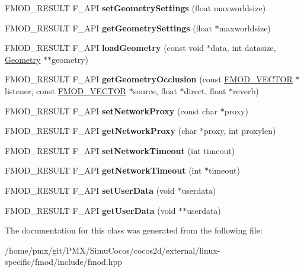 \begin{DoxyCompactItemize}
\item 
\mbox{\label{classFMOD_1_1System_a421603edcdc170de9d72d8ab95ee0fbd}} 
F\+M\+O\+D\+\_\+\+R\+E\+S\+U\+LT F\+\_\+\+A\+PI {\bfseries set\+Geometry\+Settings} (float maxworldsize)
\item 
\mbox{\label{classFMOD_1_1System_a4466ede69006041d702b6ac5be162c57}} 
F\+M\+O\+D\+\_\+\+R\+E\+S\+U\+LT F\+\_\+\+A\+PI {\bfseries get\+Geometry\+Settings} (float $\ast$maxworldsize)
\item 
\mbox{\label{classFMOD_1_1System_af9aa1402e3132a854037625ea6fabd4e}} 
F\+M\+O\+D\+\_\+\+R\+E\+S\+U\+LT F\+\_\+\+A\+PI {\bfseries load\+Geometry} (const void $\ast$data, int datasize, \hyperlink{classFMOD_1_1Geometry}{Geometry} $\ast$$\ast$geometry)
\item 
\mbox{\label{classFMOD_1_1System_ac1c462ead8eef9cbb955a898cd1c64a9}} 
F\+M\+O\+D\+\_\+\+R\+E\+S\+U\+LT F\+\_\+\+A\+PI {\bfseries get\+Geometry\+Occlusion} (const \hyperlink{structFMOD__VECTOR}{F\+M\+O\+D\+\_\+\+V\+E\+C\+T\+OR} $\ast$listener, const \hyperlink{structFMOD__VECTOR}{F\+M\+O\+D\+\_\+\+V\+E\+C\+T\+OR} $\ast$source, float $\ast$direct, float $\ast$reverb)
\item 
\mbox{\label{classFMOD_1_1System_ab1368bd2bd2bcba58d4c70c385277bd1}} 
F\+M\+O\+D\+\_\+\+R\+E\+S\+U\+LT F\+\_\+\+A\+PI {\bfseries set\+Network\+Proxy} (const char $\ast$proxy)
\item 
\mbox{\label{classFMOD_1_1System_a6346a910caaff928a7498f2bfeaf8a69}} 
F\+M\+O\+D\+\_\+\+R\+E\+S\+U\+LT F\+\_\+\+A\+PI {\bfseries get\+Network\+Proxy} (char $\ast$proxy, int proxylen)
\item 
\mbox{\label{classFMOD_1_1System_aad7cb557e4992666cfc304dfbac6d04e}} 
F\+M\+O\+D\+\_\+\+R\+E\+S\+U\+LT F\+\_\+\+A\+PI {\bfseries set\+Network\+Timeout} (int timeout)
\item 
\mbox{\label{classFMOD_1_1System_aaabd940cb1f8768ae35bf68782d72ab6}} 
F\+M\+O\+D\+\_\+\+R\+E\+S\+U\+LT F\+\_\+\+A\+PI {\bfseries get\+Network\+Timeout} (int $\ast$timeout)
\item 
\mbox{\label{classFMOD_1_1System_ab2f36a02a4badbc4fc4727f37f62b7c3}} 
F\+M\+O\+D\+\_\+\+R\+E\+S\+U\+LT F\+\_\+\+A\+PI {\bfseries set\+User\+Data} (void $\ast$userdata)
\item 
\mbox{\label{classFMOD_1_1System_a04c439bfbbfa385ce819b29b26584fc5}} 
F\+M\+O\+D\+\_\+\+R\+E\+S\+U\+LT F\+\_\+\+A\+PI {\bfseries get\+User\+Data} (void $\ast$$\ast$userdata)
\end{DoxyCompactItemize}


The documentation for this class was generated from the following file\+:\begin{DoxyCompactItemize}
\item 
/home/pmx/git/\+P\+M\+X/\+Simu\+Cocos/cocos2d/external/linux-\/specific/fmod/include/fmod.\+hpp\end{DoxyCompactItemize}
